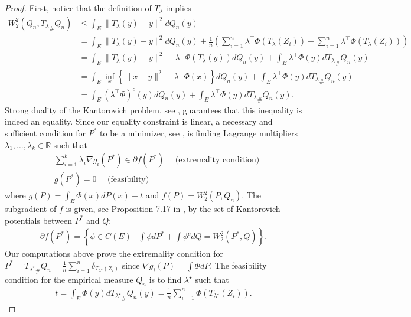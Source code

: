\documentclass[runningheads, orivec]{llncs}
\newcommand{\R}{\mathbb{R}}
\begin{document}
\begin{proof}
    First, notice that the definition of $T_\lambda$ implies
\begin{align*}
    W_2^2(Q_n,{T_\lambda}_\#Q_n)&\leq\int_E\|T_\lambda(y)-y\|^2dQ_n(y)\\
    &=\int_E\|T_\lambda(y)-y\|^2dQ_n(y) + \frac{1}{n}\left(\sum_{i=1}^n\lambda^\top\Phi(T_\lambda(Z_i))-\sum_{i=1}^n\lambda^\top\Phi(T_\lambda(Z_i))\right)\\
    &=\int_E\|T_\lambda(y)-y\|^2-\lambda^\top\Phi(T_\lambda(y))dQ_n(y) + \int_E\lambda^\top\Phi(y)d{T_\lambda}_\#Q_n(y)\\
    &=\int_E\inf_x\left\{\|x-y\|^2-\lambda^\top\Phi(x)\right\}dQ_n(y) + \int_E\lambda^\top\Phi(y)d{T_\lambda}_\#Q_n(y)\\
    &=\int_E(\lambda^\top\Phi)^c(y) dQ_n(y) + \int_E\lambda^\top\Phi(y)d{T_\lambda}_\#Q_n(y).
\end{align*}
Strong duality of the Kantorovich problem, see \cite{sant}, guarantees that this inequality is indeed an equality. Since our equality constraint is linear, a necessary and sufficient condition for $P^*$ to be a minimizer, see \cite{Peypouquet}, is finding Lagrange multipliers $\lambda_1,\ldots,\lambda_k\in\R$ such that 
    \begin{align*}
        &\sum_{i=1}^k\lambda_i\nabla g_i(P^*)\in \partial f(P^*)\quad\text{ (extremality condition)}\\ 
        & g(P^*) = 0 \quad\text{ (feasibility)}
    \end{align*}
    where $g(P) = \int_E \Phi(x)dP(x) - t$ and $f(P) = W_2^2(P,Q_n)$.
    The subgradient of $f$ is given, see Proposition 7.17 in \cite{sant}, by the set of Kantorovich potentials between $P^*$ and $Q$:
    \begin{align}
        \partial f(P^*) = \left\{ \phi\in C(E)\mid \int\phi dP^*+ \int\phi^c dQ = W_2^2(P^*,Q)\right\}.
    \end{align}
Our computations above prove the extremality condition for $P^*={T_{\lambda^\star}}_\#Q_n=\frac{1}{n} \sum_{i=1}^n \delta_{T_{\lambda^\star}(Z_i)}$ since $\nabla g_i(P) = \int\Phi dP$. The feasibility condition for the empirical measure $Q_n$ is to find $\lambda^\star$ such that
\begin{align}
    t = \int_E\Phi(y)d{T_{\lambda^\star}}_\#Q_n(y)=\frac{1}{n}\sum_{i=1}^n\Phi(T_{\lambda^\star}(Z_i)).
\end{align}

 
\end{proof}
\end{document}
